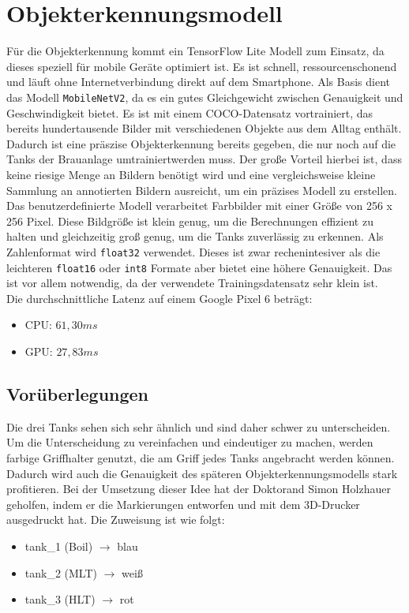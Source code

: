 \section{Objekterkennungsmodell}
Für die Objekterkennung kommt ein TensorFlow Lite Modell zum Einsatz, da dieses speziell für mobile Geräte optimiert ist. Es ist schnell, ressourcenschonend und läuft ohne Internetverbindung direkt auf dem Smartphone. 
Als Basis dient das Modell \verb|MobileNetV2|, da es ein gutes Gleichgewicht zwischen Genauigkeit und Geschwindigkeit bietet. Es ist mit einem COCO-Datensatz vortrainiert, das bereits hundertausende Bilder mit verschiedenen Objekte aus dem Alltag enthält. Dadurch ist eine präszise Objekterkennung bereits gegeben, die nur noch auf die Tanks der Brauanlage \glqq umtrainiert\grqq werden muss. Der große Vorteil hierbei ist, dass keine riesige Menge an Bildern benötigt wird und eine vergleichsweise kleine Sammlung an annotierten Bildern ausreicht, um ein präzises Modell zu erstellen.
\\
Das benutzerdefinierte Modell verarbeitet Farbbilder mit einer Größe von 256 x 256 Pixel. Diese Bildgröße ist klein genug, um die Berechnungen effizient zu halten und gleichzeitig groß genug, um die Tanks zuverlässig zu erkennen. 
Als Zahlenformat wird \verb|float32| verwendet. Dieses ist zwar rechenintesiver als die leichteren \verb|float16| oder \verb|int8| Formate aber bietet eine höhere Genauigkeit. Das ist vor allem notwendig, da der verwendete Trainingsdatensatz sehr klein ist. 
\\
Die durchschnittliche Latenz\cite{GoogleMediaPipe} auf einem Google Pixel 6 beträgt:
\begin{itemize}
    \item CPU: $61,30 ms$
    \item GPU: $27,83 ms$
\end{itemize}
\subsection{Vorüberlegungen}

Die drei Tanks sehen sich sehr ähnlich und sind daher schwer zu unterscheiden. Um die Unterscheidung zu vereinfachen und eindeutiger zu machen, werden farbige Griffhalter genutzt, die am Griff jedes Tanks angebracht werden können. Dadurch wird auch die Genauigkeit des späteren Objekterkennungsmodells stark profitieren. Bei der Umsetzung dieser Idee hat der Doktorand Simon Holzhauer geholfen, indem er die Markierungen entworfen und mit dem 3D-Drucker ausgedruckt hat. Die Zuweisung ist wie folgt:
\begin{itemize}
    \item tank\_1 (Boil) $\rightarrow$ blau
    \item tank\_2 (MLT) $\rightarrow$ weiß
    \item tank\_3 (HLT) $\rightarrow$ rot
 \end{itemize}

